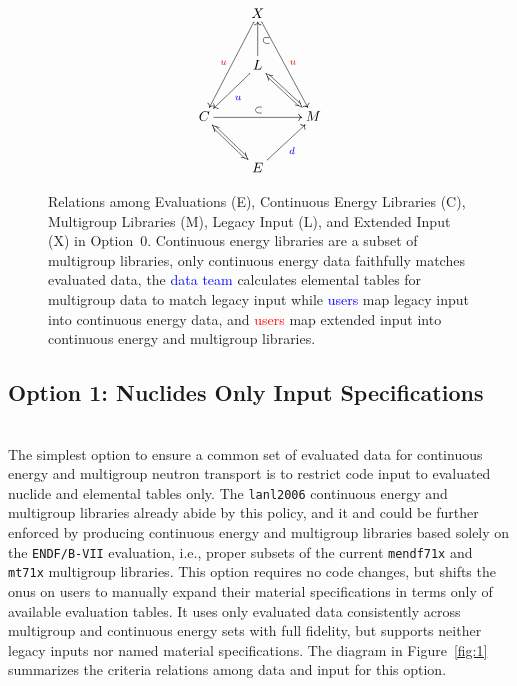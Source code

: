 \documentclass[12pt]{lamemo}
\begin{document}
\setcounter{figure}{-1}
\begin{figure}\centering
\[
\xymatrix{
  & X \ar[ddl]_{\textcolor{red}{u}} \ar[ddr]^{\textcolor{red}{u}} & \\
  & L \ar[dl]^{\textcolor{blue}{u}} \ar@{<=>}[dr] \ar[u]_{\subset} & \\
  C \ar[rr]^{\subset} & & M \\
  & E \ar@{<=>}[ul] \ar[ur]_{\textcolor{blue}{d}} &
}
\]
\caption{Relations among Evaluations (E), Continuous Energy Libraries
  (C), Multigroup Libraries (M), Legacy Input (L), and Extended Input
  (X) in Option~0.  Continuous energy libraries are a subset of
  multigroup libraries, only continuous energy data faithfully matches
  evaluated data, the \textcolor{blue}{data team} calculates elemental
  tables for multigroup data to match legacy input while
  \textcolor{blue}{users} map legacy input into continuous energy
  data, and \textcolor{red}{users} map extended input into continuous
  energy and multigroup libraries.} \label{fig:0}
\end{figure}

\subsection{Option 1: Nuclides Only Input Specifications}\mbox{}\\

The simplest option to ensure a common set of evaluated data for
continuous energy and multigroup neutron transport is to restrict code
input to evaluated nuclide and elemental tables only.  The
\texttt{lanl2006} continuous energy\cite{gray14} and
multigroup\cite{white07} libraries already abide by this policy, and
it and could be further enforced by producing continuous energy and
multigroup libraries based solely on the \texttt{ENDF/B-VII}
evaluation, i.e., proper subsets of the current \texttt{mendf71x} and
\texttt{mt71x}\cite{conlin15} multigroup libraries.  This option
requires no code changes, but shifts the onus on users to manually
expand their material specifications in terms only of available
evaluation tables.  It uses only evaluated data consistently across
multigroup and continuous energy sets with full fidelity, but supports
neither legacy inputs nor named material specifications.  The diagram
in Figure~\ref{fig:1} summarizes the criteria relations among data and
input for this option.
\end{document}
